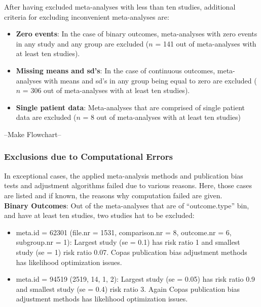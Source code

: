 \documentclass[11pt,a4paper,twoside]{book}\usepackage[]{graphicx}\usepackage[]{color}
\begin{document}
After having excluded meta-analyses with less than ten studies, additional criteria for excluding inconvenient meta-analyses are:
\begin{itemize}
\item \textbf{Zero events}: In the case of binary outcomes, meta-analyses with zero events in any study and any group are excluded ($n$ = 141 out of meta-analyses with at least ten studies).
\item \textbf{Missing means and sd's}: In the case of continuous outcomes, meta-analyses with means and sd's in any group being equal to zero are excluded ($n$ = 306 out of meta-analyses with at least ten studies).
\item \textbf{Single patient data}: Meta-analyses that are comprised of single patient data are excluded ($n$ = 8 out of meta-analyses with at least ten studies)
\end{itemize}

--Make Flowchart--

\subsubsection{Exclusions due to Computational Errors}
In exceptional cases, the applied meta-analysis methods and publication bias tests and adjustment algorithms failed due to various reasons. Here, those cases are listed and if known, the reasons why computation failed are given.\\
\textbf{Binary Outcomes}: Out of the meta-analyses that are of ``outcome.type'' bin, and have at least ten studies, two studies hat to be excluded:
\begin{itemize}
\item meta.id = 62301 (file.nr = 1531, comparison.nr = 8, outcome.nr = 6, subgroup.nr = 1):
Largest study (se = 0.1) has risk ratio 1 and smallest study (se = 1) risk ratio 0.07. Copas publication bias adjustment methods has likelihood optimization issues.
\item meta.id = 94519 (2519, 14, 1, 2): Largest study (se = 0.05) has risk ratio 0.9 and smallest study (se = 0.4) risk ratio 3. Again Copas publication bias adjustment methods has likelihood optimization issues.
\end{itemize}
\end{document}
